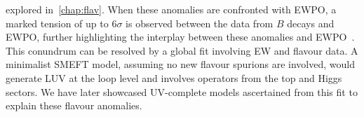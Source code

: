 explored in~\autoref{chap:flav}. When these anomalies are confronted with EWPO, a marked tension of up to $ 6\sigma$ is observed between the data from $B$ decays and EWPO, further highlighting the interplay between these anomalies and EWPO~\cite{Bhattacharya:2014wla,Feruglio:2016gvd,Celis:2017doq,Buttazzo:2017ixm, Kumar:2018kmr,Ciuchini:2019usw,Aebischer:2019mlg,Cornella:2019hct}.\\ This conundrum can be resolved by a global fit involving EW and flavour data. A minimalist SMEFT model, assuming no new flavour spurions are involved, would generate LUV at the loop level and involves operators from the top and Higgs sectors. We have later showcased UV-complete models ascertained from this fit to explain these flavour anomalies.